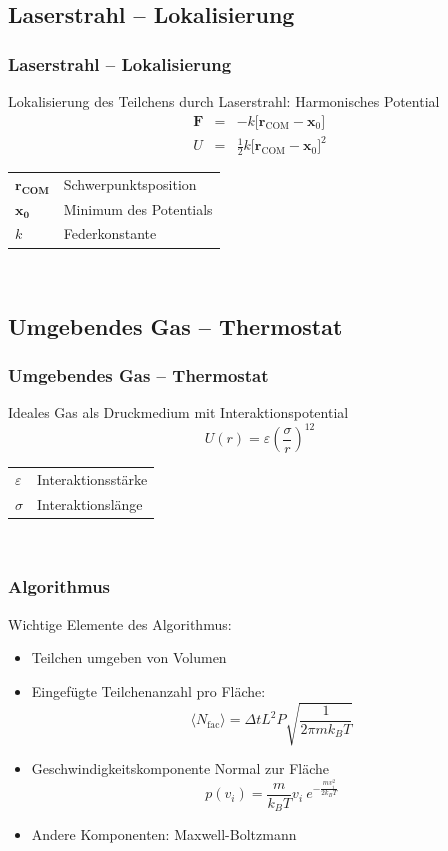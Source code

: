 \documentclass{beamer}
\begin{document}
\subsection{Laserstrahl -- Lokalisierung}
\begin{frame} 
\frametitle{Laserstrahl -- Lokalisierung}
Lokalisierung des Teilchens durch Laserstrahl: Harmonisches Potential
\begin{eqnarray}
    \mathbf{F} &=& -k \Big[\mathbf{r}_\text{COM}-\mathbf{x}_0\Big]\\
    U &=& \frac12 k \Big[\mathbf{r}_\text{COM}-\mathbf{x}_0\Big]^2
\end{eqnarray}
\begin{tabular}{l l}
$\mathbf{r_\text{COM}}$ & Schwerpunktsposition\\
$\mathbf{x_0}$ & Minimum des Potentials\\
$k$ & Federkonstante\\
\end{tabular}\\
\end{frame}

\subsection{Umgebendes Gas -- Thermostat}
\begin{frame}
\frametitle{Umgebendes Gas -- Thermostat}
Ideales Gas als Druckmedium mit Interaktionspotential
\begin{equation}
    \label{eq:softsphere}
    U(r) = \varepsilon \left(\frac{\sigma}{r}\right)^{12}
\end{equation}
\begin{tabular}{l l}
$\varepsilon$ & Interaktionsstärke\\
$\sigma$ & Interaktionslänge\\
\end{tabular}\\
\end{frame}

\begin{frame}
\frametitle{Algorithmus}
Wichtige Elemente des Algorithmus:
\begin{itemize}
\item Teilchen umgeben von Volumen
\item Eingefügte Teilchenanzahl pro Fläche: 
\begin{equation}
    \langle N_\text{fac}\rangle = \Delta t L^2 P \sqrt{\frac{1}{2\pi m k_B T}}
\end{equation}
\item Geschwindigkeitskomponente Normal zur Fläche
\begin{equation}
    p(v_i) = \frac{m}{k_B T}v_i \ e^{-\frac{mv_i^2}{2k_BT}}
\end{equation}
\item Andere Komponenten: Maxwell-Boltzmann
\end{itemize}
\end{frame}
\end{document}
